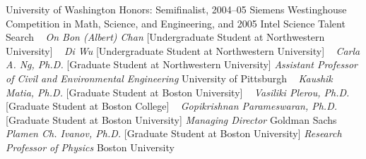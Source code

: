     \newline
    University of Washington
    \newline
    {\footnotesize Honors: Semifinalist, 2004--05 Siemens Westinghouse Competition in Math, Science, and Engineering, and 2005 Intel Science Talent Search}
    \newline
~
\Gap{}
\textit{On Bon (Albert) Chan}
    [Undergraduate Student at Northwestern University]
\newline
~
\Gap{}
\textit{Di Wu}
    [Undergraduate Student at Northwestern University]
\newline
~
\Gap{}
\textit{Carla A. Ng, Ph.D.}
    [Graduate Student at Northwestern University]
\newline
    \textit{Assistant Professor of Civil and Environmental Engineering}
    \newline
    University of Pittsburgh
    \newline
~
\Gap{}
\textit{Kaushik Matia, Ph.D.}
    [Graduate Student at Boston University]
\newline
~
\Gap{}
\textit{Vasiliki Plerou, Ph.D.}
    [Graduate Student at Boston College]
\newline
~
\Gap{}
\textit{Gopikrishnan Parameswaran, Ph.D.}
    [Graduate Student at Boston University]
\newline
    \textit{Managing Director}
    \newline
    Goldman Sachs
    \newline
~
\Gap{}
\textit{Plamen Ch. Ivanov, Ph.D.}
    [Graduate Student at Boston University]
\newline
    \textit{Research Professor of Physics}
    \newline
    Boston University
    \newline
~
\Gap\vspace*{0.2cm}